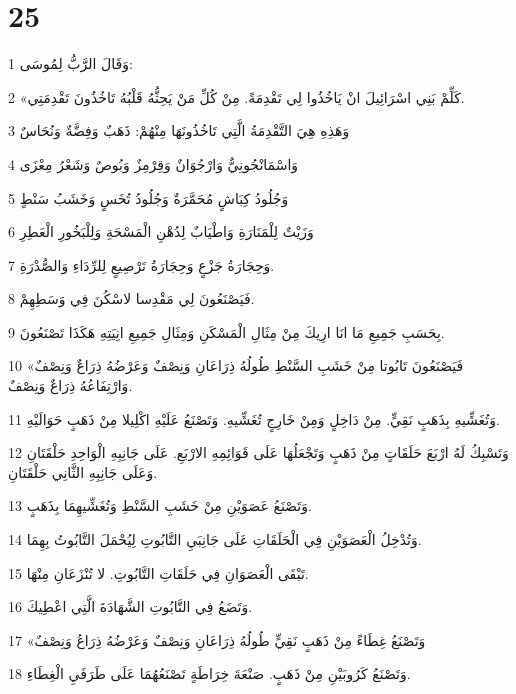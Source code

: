 \chapter{25}

\par 1 وَقَالَ الرَّبُّ لِمُوسَى:
\par 2 «كَلِّمْ بَنِي اسْرَائِيلَ انْ يَاخُذُوا لِي تَقْدِمَةً. مِنْ كُلِّ مَنْ يَحِثُّهُ قَلْبُهُ تَاخُذُونَ تَقْدِمَتِي.
\par 3 وَهَذِهِ هِيَ التَّقْدِمَةُ الَّتِي تَاخُذُونَهَا مِنْهُمْ: ذَهَبٌ وَفِضَّةٌ وَنُحَاسٌ
\par 4 وَاسْمَانْجُونِيٌّ وَارْجُوَانٌ وَقِرْمِزٌ وَبُوصٌ وَشَعْرُ مِعْزَى
\par 5 وَجُلُودُ كِبَاشٍ مُحَمَّرَةٌ وَجُلُودُ تُخَسٍ وَخَشَبُ سَنْطٍ
\par 6 وَزَيْتٌ لِلْمَنَارَةِ وَاطْيَابٌ لِدُهْنِ الْمَسْحَةِ وَلِلْبَخُورِ الْعَطِرِ
\par 7 وَحِجَارَةُ جَزْعٍ وَحِجَارَةُ تَرْصِيعٍ لِلرِّدَاءِ وَالصُّدْرَةِ.
\par 8 فَيَصْنَعُونَ لِي مَقْدِسا لاسْكُنَ فِي وَسَطِهِمْ.
\par 9 بِحَسَبِ جَمِيعِ مَا انَا ارِيكَ مِنْ مِثَالِ الْمَسْكَنِ وَمِثَالِ جَمِيعِ انِيَتِهِ هَكَذَا تَصْنَعُونَ.
\par 10 «فَيَصْنَعُونَ تَابُوتا مِنْ خَشَبِ السَّنْطِ طُولُهُ ذِرَاعَانِ وَنِصْفٌ وَعَرْضُهُ ذِرَاعٌ وَنِصْفٌ وَارْتِفَاعُهُ ذِرَاعٌ وَنِصْفٌ.
\par 11 وَتُغَشِّيهِ بِذَهَبٍ نَقِيٍّ. مِنْ دَاخِلٍ وَمِنْ خَارِجٍ تُغَشِّيهِ. وَتَصْنَعُ عَلَيْهِ اكْلِيلا مِنْ ذَهَبٍ حَوَالَيْهِ.
\par 12 وَتَسْبِكُ لَهُ ارْبَعَ حَلَقَاتٍ مِنْ ذَهَبٍ وَتَجْعَلُهَا عَلَى قَوَائِمِهِ الارْبَعِ. عَلَى جَانِبِهِ الْوَاحِدِ حَلْقَتَانِ وَعَلَى جَانِبِهِ الثَّانِي حَلْقَتَانِ.
\par 13 وَتَصْنَعُ عَصَوَيْنِ مِنْ خَشَبِ السَّنْطِ وَتُغَشِّيهِمَا بِذَهَبٍ.
\par 14 وَتُدْخِلُ الْعَصَوَيْنِ فِي الْحَلَقَاتِ عَلَى جَانِبَيِ التَّابُوتِ لِيُحْمَلَ التَّابُوتُ بِهِمَا.
\par 15 تَبْقَى الْعَصَوَانِ فِي حَلَقَاتِ التَّابُوتِ. لا تُنْزَعَانِ مِنْهَا.
\par 16 وَتَضَعُ فِي التَّابُوتِ الشَّهَادَةَ الَّتِي اعْطِيكَ.
\par 17 «وَتَصْنَعُ غِطَاءً مِنْ ذَهَبٍ نَقِيٍّ طُولُهُ ذِرَاعَانِ وَنِصْفٌ وَعَرْضُهُ ذِرَاعُ وَنِصْفٌ
\par 18 وَتَصْنَعُ كَرُوبَيْنِ مِنْ ذَهَبٍ. صَنْعَةَ خِرَاطَةٍ تَصْنَعُهُمَا عَلَى طَرَفَيِ الْغِطَاءِ.
